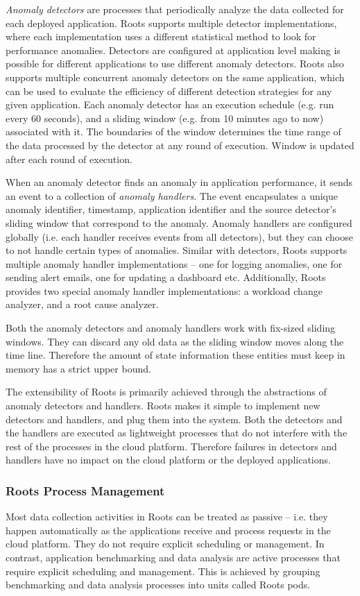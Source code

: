 \textit{Anomaly detectors} are processes that periodically analyze the data collected for
each deployed application. Roots supports multiple detector implementations, where each implementation
uses a different statistical method to look for performance anomalies. Detectors are configured
at application level making is possible for different applications to use different anomaly 
detectors. Roots also supports multiple concurrent anomaly detectors on the same application, which can be used
to evaluate the efficiency of different detection strategies for any given application. Each
anomaly detector has an execution schedule (e.g. run every 60 seconds), and a sliding window 
(e.g. from 10 minutes ago to now)
associated with it. The boundaries of the window determines the time range
of the data processed by the detector at any round of execution. Window is updated 
after each round of execution.

When an anomaly detector finds an anomaly in application performance, it sends an event
to a collection of \textit{anomaly handlers}. The event encapsulates a unique anomaly identifier, 
timestamp, application identifier and the source detector's sliding window that correspond to the
anomaly. Anomaly handlers are configured globally (i.e. each handler
receives events from all detectors), but they can choose to not handle certain types
of anomalies. Similar with detectors, Roots supports multiple anomaly handler
implementations -- one for logging anomalies, one for sending alert emails, one
for updating a dashboard etc. Additionally, Roots provides two special anomaly handler
implementations: a workload change analyzer, and a root cause analyzer.

Both the anomaly detectors and anomaly handlers work with fix-sized sliding windows.
They can discard any old data as the sliding window moves along the time line.
Therefore the amount of state information these entities must keep in memory has
a strict upper bound. 

The extensibility of Roots is primarily achieved through the abstractions of anomaly
detectors and handlers. Roots makes it simple to implement new detectors and handlers,
and plug them into the system. Both the detectors and the handlers are executed
as lightweight processes that do not interfere with the rest of the processes in
the cloud platform. Therefore failures in detectors and handlers have no impact
on the cloud platform or the deployed applications.

\subsubsection{Roots Process Management}
Most data collection activities in Roots can be treated as passive -- i.e. they
happen automatically as the applications receive and process requests in the cloud
platform. They do not require explicit scheduling or management. In contrast,
application benchmarking and data analysis are active processes that require
explicit scheduling and management.  This is achieved by grouping benchmarking
and data analysis processes into units called Roots pods. 


